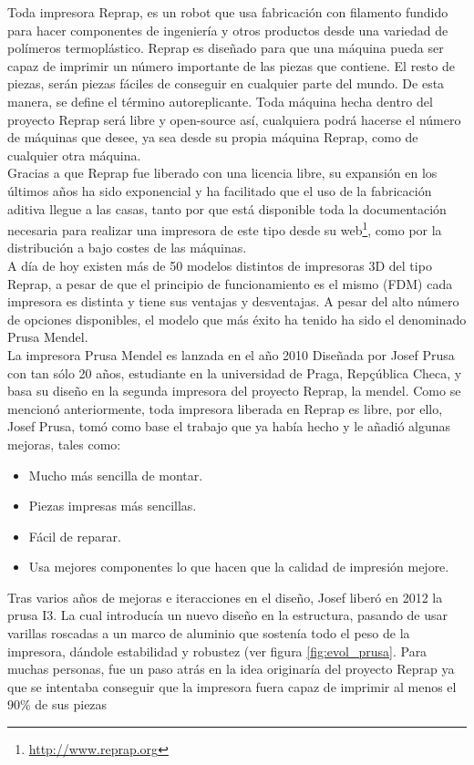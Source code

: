 Toda impresora Reprap, es un robot que usa fabricación con filamento fundido para hacer componentes de ingeniería y otros productos desde una variedad de polímeros termoplástico. Reprap es diseñado para que una máquina pueda ser capaz de imprimir un número importante de las piezas que contiene. El resto de piezas, serán piezas fáciles de conseguir en cualquier parte del mundo. De esta manera, se define el término autoreplicante. Toda máquina hecha dentro del proyecto Reprap será libre y open-source así, cualquiera podrá hacerse el número de máquinas que desee, ya sea desde su propia máquina Reprap, como de cualquier otra máquina.\\

Gracias a que Reprap fue liberado con una licencia libre, su expansión en los últimos años ha sido exponencial y ha facilitado que el uso de la fabricación aditiva llegue a las casas, tanto por que está disponible toda la documentación necesaria para realizar una impresora de este tipo desde su web\footnote{\url{http://www.reprap.org}}, como por la distribución a bajo costes de las máquinas.\\

A día de hoy existen más de 50 modelos distintos de impresoras 3D del tipo Reprap, a pesar de que el principio de funcionamiento es el mismo (FDM) cada impresora es distinta y tiene sus ventajas y desventajas. A pesar del alto número de opciones disponibles, el modelo que más éxito ha tenido ha sido el denominado Prusa Mendel.\\

La impresora Prusa Mendel es lanzada en el año 2010 Diseñada por Josef Prusa con tan sólo 20 años, estudiante en la universidad de Praga, Repçública Checa, y basa su diseño en la segunda impresora del proyecto Reprap, la mendel. Como se mencionó anteriormente, toda impresora liberada en Reprap es libre, por ello, Josef Prusa, tomó como base el trabajo que ya había hecho y le añadió algunas mejoras, tales como:

\begin{itemize}
    \item Mucho más sencilla de montar.
    \item Piezas impresas más sencillas.
    \item Fácil de reparar.
    \item Usa mejores componentes lo que hacen que la calidad de impresión mejore.
\end{itemize}

Tras varios años de mejoras e iteracciones en el diseño, Josef liberó en 2012 la prusa I3. La cual introducía un nuevo diseño en la estructura, pasando de usar varillas roscadas a un marco de aluminio que sostenía todo el peso de la impresora, dándole estabilidad y robustez (ver figura \ref{fig:evol_prusa}. Para muchas personas, fue un paso atrás en la idea originaría del proyecto Reprap ya que se intentaba conseguir que la impresora fuera capaz de imprimir al menos el 90\% de sus piezas

